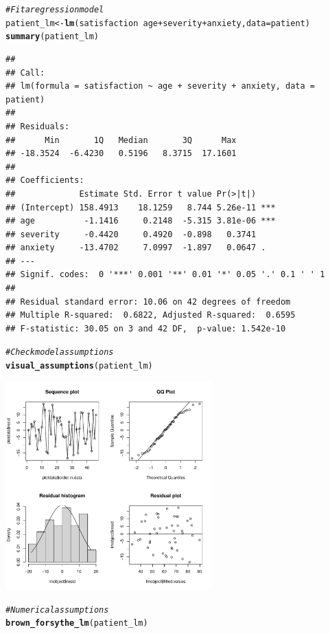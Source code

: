 \documentclass{article}\usepackage[]{graphicx}\usepackage[]{color}
\makeatletter
\newcommand{\hlcom}[1]{\textcolor[rgb]{0.678,0.584,0.686}{\textit{#1}}}%
\newcommand{\hlopt}[1]{\textcolor[rgb]{0,0,0}{#1}}%
\newcommand{\hlstd}[1]{\textcolor[rgb]{0.345,0.345,0.345}{#1}}%
\newcommand{\hlkwb}[1]{\textcolor[rgb]{0.69,0.353,0.396}{#1}}%
\newcommand{\hlkwc}[1]{\textcolor[rgb]{0.333,0.667,0.333}{#1}}%
\newcommand{\hlkwd}[1]{\textcolor[rgb]{0.737,0.353,0.396}{\textbf{#1}}}%
\newenvironment{kframe}{%
 \def\at@end@of@kframe{}%
 \ifinner\ifhmode%
  \def\at@end@of@kframe{\end{minipage}}%
  \begin{minipage}{\columnwidth}%
 \fi\fi%
 \def\FrameCommand##1{\hskip\@totalleftmargin \hskip-\fboxsep
 \colorbox{shadecolor}{##1}\hskip-\fboxsep
     \hskip-\linewidth \hskip-\@totalleftmargin \hskip\columnwidth}%
 \MakeFramed {\advance\hsize-\width
   \@totalleftmargin\z@ \linewidth\hsize
   \@setminipage}}%
 {\par\unskip\endMakeFramed%
 \at@end@of@kframe}
\newenvironment{knitrout}{}{} %
\makeatother
\begin{document}
\begin{knitrout}
\begin{kframe}\begin{alltt}
\hlcom{# Fit a regression model}
\hlstd{patient_lm} \hlkwb{<-} \hlkwd{lm}\hlstd{(satisfaction} \hlopt{~} \hlstd{age} \hlopt{+} \hlstd{severity} \hlopt{+} \hlstd{anxiety,} \hlkwc{data} \hlstd{= patient)}
\hlkwd{summary}\hlstd{(patient_lm)}
\end{alltt}
\begin{verbatim}
## 
## Call:
## lm(formula = satisfaction ~ age + severity + anxiety, data = patient)
## 
## Residuals:
##      Min       1Q   Median       3Q      Max 
## -18.3524  -6.4230   0.5196   8.3715  17.1601 
## 
## Coefficients:
##             Estimate Std. Error t value Pr(>|t|)    
## (Intercept) 158.4913    18.1259   8.744 5.26e-11 ***
## age          -1.1416     0.2148  -5.315 3.81e-06 ***
## severity     -0.4420     0.4920  -0.898   0.3741    
## anxiety     -13.4702     7.0997  -1.897   0.0647 .  
## ---
## Signif. codes:  0 '***' 0.001 '**' 0.01 '*' 0.05 '.' 0.1 ' ' 1
## 
## Residual standard error: 10.06 on 42 degrees of freedom
## Multiple R-squared:  0.6822,	Adjusted R-squared:  0.6595 
## F-statistic: 30.05 on 3 and 42 DF,  p-value: 1.542e-10
\end{verbatim}
\begin{alltt}
\hlcom{# Check model assumptions}
\hlkwd{visual_assumptions}\hlstd{(patient_lm)}
\end{alltt}
\end{kframe}
\includegraphics[width=0.6\textwidth]{figure/unnamed-chunk-1-2} 
\begin{kframe}\begin{alltt}
\hlcom{# Numerical assumptions}
\hlkwd{brown_forsythe_lm}\hlstd{(patient_lm)}
\end{alltt}
\begin{verbatim}

\end{verbatim}
\end{kframe}
\end{knitrout}
\end{document}
